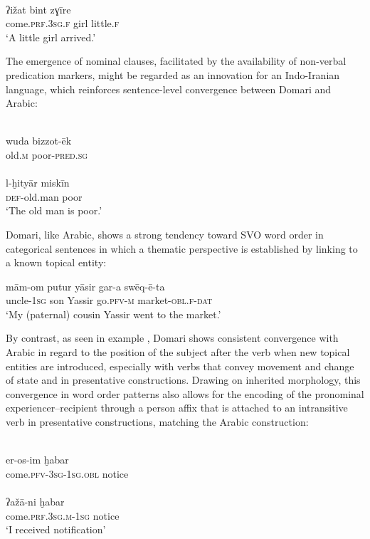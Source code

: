 \documentclass[output=paper]{langsci/langscibook}
\begin{document}
\ex\label{ex:matras:}
\\
\gll ʔižat bint zɣīre  \\
       come.\textsc{prf.3sg.f} girl little.\textsc{f}\\
\glt   ‘A little girl arrived.’ \label{girlc}
\z
\z

The emergence of nominal clauses, facilitated by the availability of non-verbal predication markers, might be regarded as an innovation for an Indo-Iranian language, which reinforces sentence-level convergence between Domari and Arabic:

\ea\label{ex:matras:}
\ea
{}\\
\gll wuda bizzot-ēk  \\
     old.\textsc{m} poor-\textsc{pred.sg}\\
     
\ex {}\\
\gll l-ḫityār miskīn  \\
     \textsc{def}{}-old.man poor\\
\glt ‘The old man is poor.’
\z
\z

Domari, like Arabic, shows a strong tendency toward SVO word order in categorical sentences in which a thematic perspective is established by linking to a known topical entity:

\ea \gll mām-om putur yāsir gar-a swēq-ē-ta\\
         uncle-\textsc{1sg} son Yassir go.\textsc{pfv-m} market-\textsc{obl.f-dat}\\
\glt     ‘My (paternal) cousin Yassir went to the market.’
\z

By contrast, as seen in example , Domari shows consistent convergence with Arabic in regard to the position of the subject after the verb when new topical entities are introduced, especially with verbs that convey movement and change of state and in presentative constructions. Drawing on inherited morphology, this convergence in word order patterns also allows for the encoding of the pronominal experiencer--recipient through a person affix that is attached to an intransitive verb in presentative constructions, matching the Arabic construction:

\ea\label{ex:matras:}
\ea
{}\\
\gll er-os-im ḫabar    \\
     come.\textsc{pfv-3sg-1sg.obl}  notice\\
\ex
{}\\
\gll  ʔažā-ni  ḫabar  \\
     come.\textsc{prf.3sg.m-1sg} notice\\
\glt ‘I received notification’
\z
\z
\end{document}
